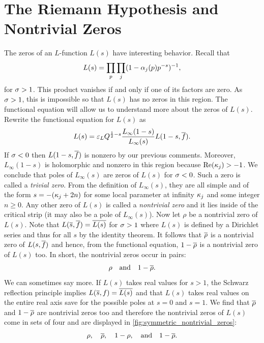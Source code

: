 \documentclass[12pt]{article}
\begin{document}
  \section{The Riemann Hypothesis and Nontrivial Zeros}
    The zeros of an \(L\)-function \(L(s)\) have interesting behavior. Recall that
    \[
      L(s) = \prod_{p}\prod_{j}(1-\alpha_{j}(p)p^{-s})^{-1},
    \]
    for \(\sigma > 1\). This product vanishes if and only if one of its factors are zero. As \(\sigma > 1\), this is impossible so that \(L(s)\) has no zeros in this region. The functional equation will allow us to understand more about the zeros of \(L(s)\). Rewrite the functional equation for \(L(s)\) as
    \begin{equation}\label{equ:fun_eq_for_zeros}
      L(s) = \varepsilon_{L}Q^{\frac{1}{2}-s}\frac{L_{\infty}(1-s)}{L_{\infty}(s)}L(1-s,\overline{f}).
    \end{equation}
    If \(\sigma < 0\) then \(L(1-s,\overline{f})\) is nonzero by our previous comments. Moreover, \(L_{\infty}(1-s)\) is holomorphic and nonzero in this region because \(\mathrm{Re}(\kappa_{j}) > -1\). We conclude that poles of \(L_{\infty}(s)\) are zeros of \(L(s)\) for \(\sigma < 0\). Such a zero is called a \textit{trivial zero}. From the definition of \(L_{\infty}(s)\), they are all simple and of the form \(s = -(\kappa_{j}+2n)\) for some local parameter at infinity \(\kappa_{j}\) and some integer \(n \ge 0\). Any other zero of \(L(s)\) is called a \textit{nontrivial zero} and it lies inside of the critical strip (it may also be a pole of \(L_{\infty}(s)\)). Now let \(\rho\) be a nontrivial zero of \(L(s)\). Note that \(L(\overline{s},\overline{f}) = \overline{L(s)}\) for \(\sigma > 1\) where \(L(s)\) is defined by a Dirichlet series and thus for all \(s\) by the identity theorem. It follows that \(\overline{\rho}\) is a nontrivial zero of \(L(s,\overline{f})\) and hence, from the functional equation, \(1-\overline{\rho}\) is a nontrivial zero of \(L(s)\) too. In short, the nontrivial zeros occur in pairs:
    \[
      \rho \quad \text{and} \quad 1-\overline{\rho}.
    \]
    We can sometimes say more. If \(L(s)\) takes real values for \(s > 1\), the Schwarz reflection principle implies \(L(\overline{s},f) = \overline{L(s)}\) and that \(L(s)\) takes real values on the entire real axis save for the possible poles at \(s = 0\) and \( s = 1\). We find that \(\overline{\rho}\) and \(1-\overline{\rho}\) are nontrivial zeros too and therefore the nontrivial zeros of \(L(s)\) come in sets of four and are displayed in \cref{fig:symmetric_nontrivial_zeros}:
    \[
      \rho, \quad \overline{\rho}, \quad 1-\rho, \quad \text{and} \quad 1-\overline{\rho}.
    \]
\end{document}
